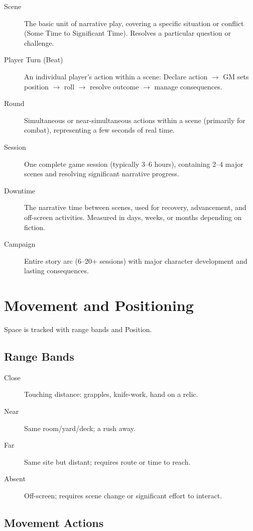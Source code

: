\documentclass[11pt,twoside,openany]{book}
\begin{document}
\begin{description}
\item[Scene] The basic unit of narrative play, covering a specific situation or conflict (Some Time to Significant Time). Resolves a particular question or challenge.
\item[Player Turn (Beat)] An individual player's action within a scene: Declare action $\rightarrow$ GM sets position $\rightarrow$ roll $\rightarrow$ resolve outcome $\rightarrow$ manage consequences.
\item[Round] Simultaneous or near-simultaneous actions within a scene (primarily for combat), representing a few seconds of real time.
\item[Session] One complete game session (typically 3--6 hours), containing 2--4 major scenes and resolving significant narrative progress.
\item[Downtime] The narrative time between scenes, used for recovery, advancement, and off-screen activities. Measured in days, weeks, or months depending on fiction.
\item[Campaign] Entire story arc (6--20+ sessions) with major character development and lasting consequences.
\end{description}

\section*{Movement and Positioning} 

Space is tracked with range bands and Position.

\subsection*{Range Bands}

\begin{description}
\item[Close] Touching distance: grapples, knife-work, hand on a relic.
\item[Near] Same room/yard/deck; a rush away.
\item[Far] Same site but distant; requires route or time to reach.
\item[Absent] Off-screen; requires scene change or significant effort to interact.
\end{description}

\subsection*{Movement Actions}
\end{document}
